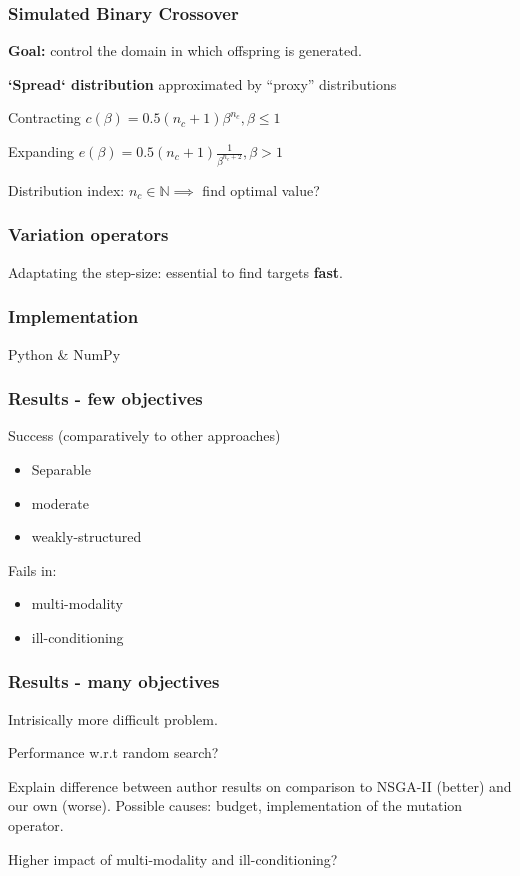 \documentclass[12pt]{beamer}
\newcommand{\bi}{\begin{itemize}}
\newcommand{\ei}{\end{itemize}}
\begin{document}
  \begin{frame}
    \frametitle{Simulated Binary Crossover}
    \textbf{Goal:} control the domain in which offspring is generated.
    
    \textbf{`Spread` distribution } approximated by ``proxy'' distributions
    
    Contracting $ c(\beta) = 0.5(n_c +1)\beta^{n_c}, \beta \leq 1$
    
	Expanding $ e(\beta) = 0.5(n_c +1)\frac{1}{\beta^{n_c+2}}, \beta > 1$
        
    Distribution index: $n_c \in \mathbb{N} \implies$ find optimal value?
  \end{frame}
    
    \begin{frame}
    \frametitle{Variation operators}
    \subtitle{Low mutation probability}
    Adaptating the step-size: essential to find targets \textbf{fast}.
    
  \end{frame}
  
    \begin{frame}
    \frametitle{Implementation}
	Python \& NumPy    
  \end{frame}
  
      \begin{frame}
    \frametitle{Results - few objectives}
    Success (comparatively to other approaches)
    \bi
    \item Separable
    \item moderate
    \item weakly-structured    
    \ei
    
	Fails in:
	\bi 
	\item multi-modality
	\item ill-conditioning
	\ei
	
  \end{frame}
  
        \begin{frame}
    \frametitle{Results - many objectives}
    Intrisically more difficult problem.
    
    Performance w.r.t random search?
    
    Explain difference between author results on comparison to NSGA-II (better) and our own (worse). Possible causes: budget, implementation of the mutation operator.
     
    Higher impact of multi-modality and ill-conditioning?
  \end{frame}
\end{document}
